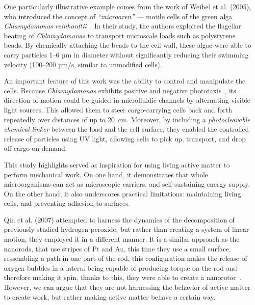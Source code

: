 One particularly illustrative example comes from the work of Weibel et al. (2005), who introduced the concept of \textit{``microoxen''} --- motile cells of the green alga \textit{Chlamydomonas reinhardtii}~\cite{weibel2005microoxen}. In their study, the authors exploited the flagellar beating of \textit{Chlamydomonas} to transport microscale loads such as polystyrene beads. By chemically attaching the beads to the cell wall, these algae were able to carry particles 1--6 µm in diameter without significantly reducing their swimming velocity (100–200 µm/s, similar to unmodified cells). 

An important feature of this work was the ability to control and manipulate the cells. Because \textit{Chlamydomonas} exhibits positive and negative phototaxis~\cite{bennett2015steering}, its direction of motion could be guided in microfluidic channels by alternating visible light sources. This allowed them to steer cargo-carrying cells back and forth repeatedly over distances of up to 20~cm. Moreover, by including a \textit{photocleavable chemical linker} between the load and the cell surface, they enabled the controlled release of particles using UV light, allowing cells to pick up, transport, and drop off cargo on demand.

This study highlights served as inspiration for using living active matter to perform mechanical work. On one hand, it demonstrates that whole microorganisms can act as microscopic carriers, and self-sustaining energy supply. On the other hand, it also underscores practical limitations: maintaining living cells, and preventing adhesion to surfaces.

 Qin et al. (2007) attempted to harness the dynamics of the decomposition of previously studied hydrogen peroxide, but rather than creating a system of linear motion, they employed it in a different manner. It is a similar approach as the nanorods, that use stripes of Pt and Au, this time they use a small surface, ressembling a path in one part of the rod, this configuration makes the release of oxygen bubbles in a lateral being capable of producing torque on the rod and therefore making it spin, thanks to this, they were able to create a nanorotor~\cite{qin2007rational}. However, we can argue that they are not harnessing the behavior of active matter to create work, but rather making active matter behave a certain way.

